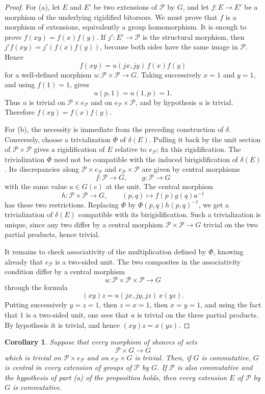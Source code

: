 \documentclass[11pt]{article}
\theoremstyle{plain}
\newtheorem{corollary}[theorem]{Corollary}
\theoremstyle{definition}
\theoremstyle{remark}
\begin{document}
\begin{proof}
For (a), let $E$ and $E'$ be two extensions of $\mathcal P$ by $G$, and let $f:E\to E'$ be a morphism of the underlying rigidified bitorsors. We must prove that $f$ is a morphism of extensions, equivalently a group homomorphism. It is enough to prove $f(xy)=f(x)f(y)$. If $j':E'\to\mathcal P$ is the structural morphism, then $j'f(xy)=j'(f(x)f(y))$, because both sides have the same image in $\mathcal P$. Hence
\[
f(xy)=u(jx,jy)\,f(x)f(y)
\]
for a well-defined morphism $u:\mathcal P\times\mathcal P\to G$. Taking successively $x=1$ and $y=1$, and using $f(1)=1$, gives
\[
u(p,1)=u(1,p)=1.
\]
Thus $u$ is trivial on $\mathcal P\times e_{\mathcal P}$ and on $e_{\mathcal P}\times\mathcal P$, and by hypothesis $u$ is trivial. Therefore $f(xy)=f(x)f(y)$.

For (b), the necessity is immediate from the preceding construction of $\delta$. Conversely, choose a trivialization $\Phi$ of $\delta(E)$. Pulling it back by the unit section of $\mathcal P\times\mathcal P$ gives a rigidification of $E$ relative to $e_{\mathcal P}$; fix this rigidification. The trivialization $\Phi$ need not be compatible with the induced birigidification of $\delta(E)$. Its discrepancies along $\mathcal P\times e_{\mathcal P}$ and $e_{\mathcal P}\times\mathcal P$ are given by central morphisms
\[
f:\mathcal P\to G,\qquad g:\mathcal P\to G
\]
with the same value $a\in G(e)$ at the unit. The central morphism
\[
h:\mathcal P\times\mathcal P\to G,\qquad (p,q)\longmapsto f(p)g(q)a^{-1}
\]
has these two restrictions. Replacing $\Phi$ by $\Phi(p,q)h(p,q)^{-1}$, we get a trivialization of $\delta(E)$ compatible with its birigidification. Such a trivialization is unique, since any two differ by a central morphism $\mathcal P\times\mathcal P\to G$ trivial on the two partial products, hence trivial.

It remains to check associativity of the multiplication defined by $\Phi$, knowing already that $e_{\mathcal P}$ is a two-sided unit. The two composites in the associativity condition differ by a central morphism
\[
u:\mathcal P\times\mathcal P\times\mathcal P\to G
\]
through the formula
\[
(xy)z=u(jx,jy,jz)\,x(yz).
\]
Putting successively $y=z=1$, then $z=x=1$, then $x=y=1$, and using the fact that $1$ is a two-sided unit, one sees that $u$ is trivial on the three partial products. By hypothesis it is trivial, and hence $(xy)z=x(yz)$.
\end{proof}

\begin{corollary}
Suppose that every morphism of sheaves of sets
\[
\mathcal P\times G\longrightarrow G
\]
which is trivial on $\mathcal P\times e_{\mathcal P}$ and on $e_{\mathcal P}\times G$ is trivial. Then, if $G$ is commutative, $G$ is central in every extension of groups of $\mathcal P$ by $G$. If $\mathcal P$ is also commutative and the hypothesis of part \textup{(a)} of the proposition holds, then every extension $E$ of $\mathcal P$ by $G$ is commutative.
\end{corollary}
\end{document}
